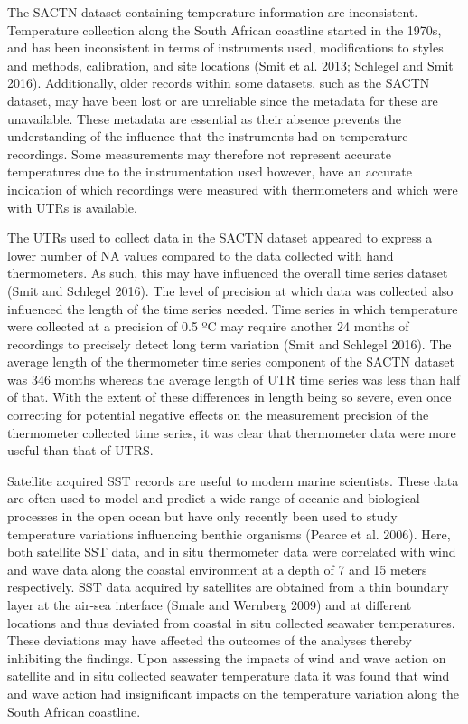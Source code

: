 \documentclass[12pt,A4paper,]{article}
\begin{document}
The SACTN dataset containing temperature information are inconsistent.
Temperature collection along the South African coastline started in the
1970s, and has been inconsistent in terms of instruments used,
modifications to styles and methods, calibration, and site locations
(Smit et al. 2013; Schlegel and Smit 2016). Additionally, older records
within some datasets, such as the SACTN dataset, may have been lost or
are unreliable since the metadata for these are unavailable. These
metadata are essential as their absence prevents the understanding of
the influence that the instruments had on temperature recordings. Some
measurements may therefore not represent accurate temperatures due to
the instrumentation used however, have an accurate indication of which
recordings were measured with thermometers and which were with UTRs is
available.

The UTRs used to collect data in the SACTN dataset appeared to express a
lower number of NA values compared to the data collected with hand
thermometers. As such, this may have influenced the overall time series
dataset (Smit and Schlegel 2016). The level of precision at which data
was collected also influenced the length of the time series needed. Time
series in which temperature were collected at a precision of 0.5 ºC may
require another 24 months of recordings to precisely detect long term
variation (Smit and Schlegel 2016). The average length of the
thermometer time series component of the SACTN dataset was 346 months
whereas the average length of UTR time series was less than half of
that. With the extent of these differences in length being so severe,
even once correcting for potential negative effects on the measurement
precision of the thermometer collected time series, it was clear that
thermometer data were more useful than that of UTRS.

Satellite acquired SST records are useful to modern marine scientists.
These data are often used to model and predict a wide range of oceanic
and biological processes in the open ocean but have only recently been
used to study temperature variations influencing benthic organisms
(Pearce et al. 2006). Here, both satellite SST data, and in situ
thermometer data were correlated with wind and wave data along the
coastal environment at a depth of 7 and 15 meters respectively. SST data
acquired by satellites are obtained from a thin boundary layer at the
air-sea interface (Smale and Wernberg 2009) and at different locations
and thus deviated from coastal in situ collected seawater temperatures.
These deviations may have affected the outcomes of the analyses thereby
inhibiting the findings. Upon assessing the impacts of wind and wave
action on satellite and in situ collected seawater temperature data it
was found that wind and wave action had insignificant impacts on the
temperature variation along the South African coastline.
\end{document}
